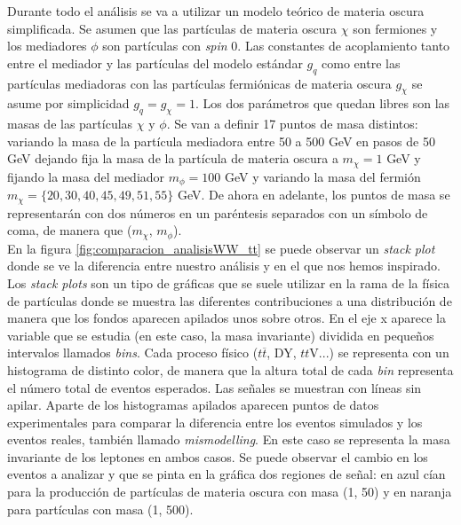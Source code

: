Durante todo el análisis se va a utilizar un modelo teórico de materia oscura simplificada. Se asumen que las partículas de materia oscura $\chi$ son fermiones y los mediadores $\phi$ son partículas con \textit{spin} 0. Las constantes de acoplamiento tanto entre el mediador y las partículas del modelo estándar $g_q$ como entre las partículas mediadoras con las partículas fermiónicas de materia oscura $g_\chi$ se asume por simplicidad $g_q = g_\chi = 1$. Los dos parámetros que quedan libres son las masas de las partículas $\chi$ y $\phi$. Se van a definir 17 puntos de masa distintos: variando la masa de la partícula mediadora entre 50 a 500 GeV en pasos de 50 GeV dejando fija la masa de la partícula de materia oscura a $m_\chi = 1$ GeV y fijando la masa del mediador $m_\phi = 100$ GeV y variando la masa del fermión $m_\chi = \{ 20, 30 ,40 ,45, 49 ,51, 55 \}$ GeV. De ahora en adelante, los puntos de masa se representarán con dos números en un paréntesis separados con un símbolo de coma, de manera que ($m_\chi$, $m_\phi$).\\

En la figura \ref{fig:comparacion_analisisWW_tt} se puede observar un \textit{stack plot} donde se ve la diferencia entre nuestro análisis y en el que nos hemos inspirado. Los \textit{stack plots} son un tipo de gráficas que se suele utilizar en la rama de la física de partículas donde se muestra las diferentes contribuciones a una distribución de manera que los fondos aparecen apilados unos sobre otros. En el eje x aparece la variable que se estudia (en este caso, la masa invariante) dividida en pequeños intervalos llamados \textit{bins}. Cada proceso físico ($t\overline{t}$, DY, $tt$V...) se representa con un histograma de distinto color, de manera que la altura total de cada \textit{bin} representa el número total de eventos esperados. Las señales se muestran con líneas sin apilar. Aparte de los histogramas apilados aparecen puntos de datos experimentales para comparar la diferencia entre los eventos simulados y los eventos reales, también llamado \textit{mismodelling}. En este caso se representa la masa invariante de los leptones en ambos casos. Se puede observar el cambio en los eventos a analizar y que se pinta en la gráfica dos regiones de señal: en azul cían para la producción de partículas de materia oscura con masa (1, 50) y en naranja para partículas con masa (1, 500).
 

